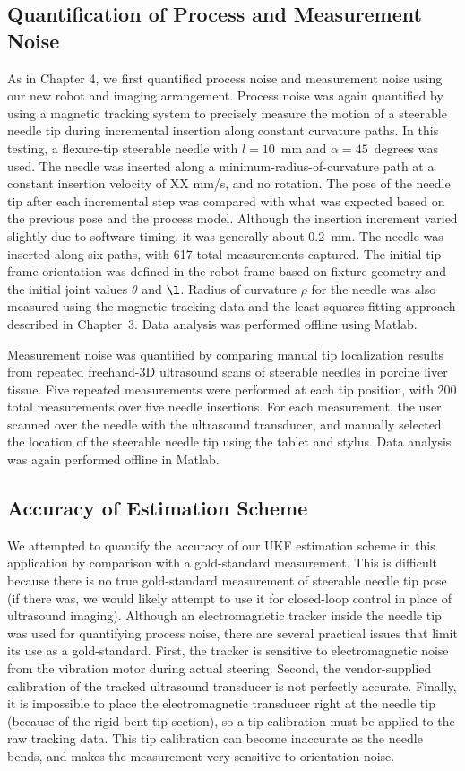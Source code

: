 \subsection{Quantification of Process and Measurement Noise}
As in Chapter 4, we first quantified process noise and measurement noise using our new robot and imaging arrangement. Process noise was again quantified by using a magnetic tracking system to precisely measure the motion of a steerable needle tip during incremental insertion along constant curvature paths. In this testing, a flexure-tip steerable needle with $l = 10$~mm and $\alpha = 45$~degrees was used. The needle was inserted along a minimum-radius-of-curvature path at a constant insertion velocity of XX mm/s, and no rotation. The pose of the needle tip after each incremental step was compared with what was expected based on the previous pose and the process model. Although the insertion increment varied slightly due to software timing, it was generally about 0.2~mm. The needle was inserted along six paths, with 617 total measurements captured. The initial tip frame orientation was defined in the robot frame based on fixture geometry and the initial joint values $\theta$ and $\l$. Radius of curvature $\rho$ for the needle was also measured using the magnetic tracking data and the least-squares fitting approach described in Chapter~3. Data analysis was performed offline using Matlab. 

Measurement noise was quantified by comparing manual tip localization results from repeated freehand-3D ultrasound scans of steerable needles in porcine liver tissue. Five repeated measurements were performed at each tip position, with 200 total measurements over five needle insertions. For each measurement, the user scanned over the needle with the ultrasound transducer, and manually selected the location of the steerable needle tip using the tablet and stylus. Data analysis was again performed offline in Matlab.

\subsection{Accuracy of Estimation Scheme}
We attempted to quantify the accuracy of our UKF estimation scheme in this application by comparison with a gold-standard measurement. This is difficult because there is no true gold-standard measurement of steerable needle tip pose (if there was, we would likely attempt to use it for closed-loop control in place of ultrasound imaging). Although an electromagnetic tracker inside the needle tip was used for quantifying process noise, there are several practical issues that limit its use as a gold-standard. First, the tracker is sensitive to electromagnetic noise from the vibration motor during actual steering. Second, the vendor-supplied calibration of the tracked ultrasound transducer is not perfectly accurate. Finally, it is impossible to place the electromagnetic transducer right at the needle tip (because of the rigid bent-tip section), so a tip calibration must be applied to the raw tracking data. This tip calibration can become inaccurate as the needle bends, and makes the measurement very sensitive to orientation noise. 

